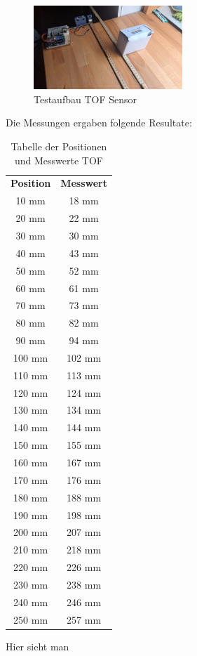 \documentclass[../main.tex]{subfiles}
\begin{document}
\begin{figure}[h] %
    \centering
    \includegraphics[width=0.5\textwidth]{img/sensortest/TOF_Verschoben.jpg} %
    \caption{Testaufbau TOF Sensor}
    \label{fig:TOF1} %
\end{figure}



Die Messungen ergaben folgende Resultate:


\begin{table}[H]
    \centering
    \begin{tabular}{cc} %
        \textbf{Position} & \textbf{Messwert} \\ %
        10 mm  & 18 mm  \\
        20 mm  & 22 mm  \\
        30 mm  & 30 mm  \\
        40 mm  & 43 mm  \\
        50 mm  & 52 mm  \\
        60 mm  & 61 mm  \\
        70 mm  & 73 mm  \\
        80 mm  & 82 mm  \\
        90 mm  & 94 mm  \\
        100 mm & 102 mm \\
        110 mm & 113 mm \\
        120 mm & 124 mm \\
        130 mm & 134 mm \\
        140 mm & 144 mm \\
        150 mm & 155 mm \\
        160 mm & 167 mm \\
        170 mm & 176 mm \\
        180 mm & 188 mm \\
        190 mm & 198 mm \\
        200 mm & 207 mm \\
        210 mm & 218 mm \\
        220 mm & 226 mm \\
        230 mm & 238 mm \\
        240 mm & 246 mm \\
        250 mm & 257 mm \\
    \end{tabular}
    \caption{Tabelle der Positionen und Messwerte TOF}
    \label{tab:messwerte}
\end{table}
Hier sieht man 
\end{document}
